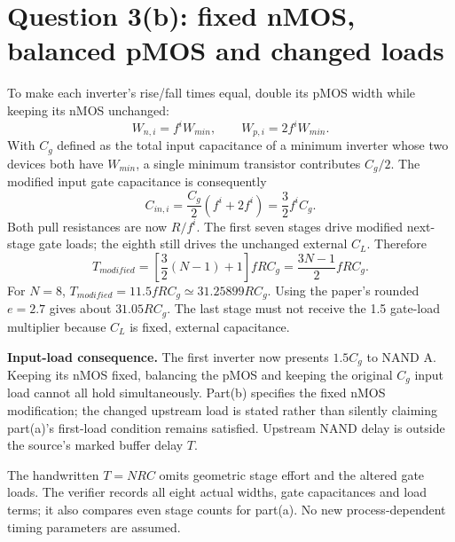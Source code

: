 \documentclass[10pt]{article}
\begin{document}
\newpage\section*{Question 3(b): fixed nMOS, balanced pMOS and changed loads}
To make each inverter's rise/fall times equal, double its pMOS width while keeping its nMOS unchanged:
\[W_{n,i}=f^iW_{min},\qquad W_{p,i}=2f^iW_{min}.\]
With $C_g$ defined as the total input capacitance of a minimum inverter whose two devices both have $W_{min}$, a single minimum transistor contributes $C_g/2$. The modified input gate capacitance is consequently
\[C_{in,i}=\frac{C_g}{2}(f^i+2f^i)=\frac32f^iC_g.\]
Both pull resistances are now $R/f^i$. The first seven stages drive modified next-stage gate loads; the eighth still drives the unchanged external $C_L$. Therefore
\[\boxed{T_{modified}=\left[\frac32(N-1)+1\right]fRC_g=\frac{3N-1}{2}fRC_g.}\]
For $N=8$, $T_{modified}=11.5fRC_g\simeq31.25899RC_g$. Using the paper's rounded $e=2.7$ gives about $31.05RC_g$. The last stage must not receive the 1.5 gate-load multiplier because $C_L$ is fixed, external capacitance.

\textbf{Input-load consequence.} The first inverter now presents $1.5C_g$ to NAND A. Keeping its nMOS fixed, balancing the pMOS and keeping the original $C_g$ input load cannot all hold simultaneously. Part(b) specifies the fixed nMOS modification; the changed upstream load is stated rather than silently claiming part(a)'s first-load condition remains satisfied. Upstream NAND delay is outside the source's marked buffer delay $T$.

The handwritten $T=NRC$ omits geometric stage effort and the altered gate loads. The verifier records all eight actual widths, gate capacitances and load terms; it also compares even stage counts for part(a). No new process-dependent timing parameters are assumed.
\end{document}
